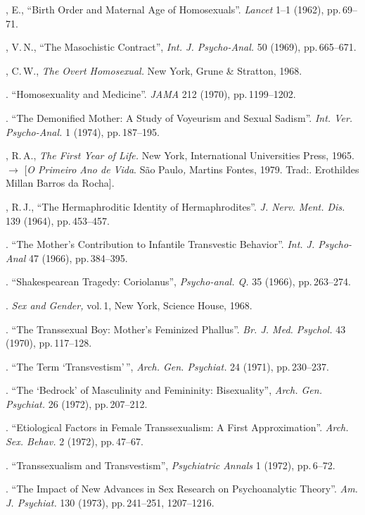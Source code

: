 \begin{bibliohedra}
, E., ``Birth Order and Maternal Age of
Homosexuals''. \textit{Lancet } 1--1 (1962), pp.\,69--71.

, V.\,N., ``The Masochistic Contract'',
\textit{Int. J. Psycho-Anal. }50 (1969), pp.\,665--671.

, C.\,W., \textit{The Overt Homosexual. }New York, Grune \& Stratton,
1968.

. ``Homosexuality and Medicine''.
\textit{JAMA }212 (1970), pp.\,1199--1202.

. ``The Demonified Mother: A Study of Voyeurism
and Sexual Sadism''. \textit{Int. Ver. Psycho-Anal. }1 (1974), pp.\,187--195.

, R.\,A., \textit{The First Year of Life. }New York, International
Universities Press, 1965. {$\bm{\rightarrow}$} [\textit{O Primeiro Ano de Vida}. São Paulo\textit{, }
Martins Fontes, 1979. Trad:. Erothildes Millan Barros da Rocha].

, R.\,J., ``The Hermaphroditic Identity of
Hermaphrodites''. \textit{J. Nerv. Ment. Dis. }139 (1964), pp.\,453--457.

. ``The Mother's Contribution to
Infantile Transvestic Behavior''. \textit{Int. J. Psycho-Anal } 47
(1966), pp.\,384--395.

. ``Shakespearean Tragedy:
Coriolanus'', \textit{Psycho-anal. Q. }35 (1966), pp.\,263--274.

. \textit{Sex and Gender, }vol.\,1, New York, Science House,
1968.

. ``The Transsexual Boy:
Mother's Feminized Phallus''. \textit{Br. J. Med.
Psychol. }43 (1970), pp.\,117--128.

. ``The Term `Transvestism'\,'', \textit{Arch.
Gen. Psychiat. }24 (1971), pp.\,230--237.

. ``The `Bedrock' of Masculinity and Femininity:
Bisexuality'', \textit{Arch. Gen. Psychiat. }26 (1972), pp.\,207--212.

. ``Etiological Factors in Female Transsexualism:
A First Approximation''. \textit{Arch. Sex. Behav. }2 (1972), pp.\,47--67.

. ``Transsexualism and
Transvestism'', \textit{Psychiatric Annals }1 (1972), pp.\,6--72.

. ``The Impact of New Advances in Sex Research on
Psychoanalytic Theory''. \textit{Am. J. Psychiat. }130 (1973), pp.\,241--251, 1207--1216.


\end{bibliohedra}
